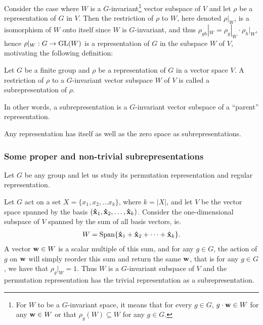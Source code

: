Consider the case where $W$ is a $G$-invariant\footnote{For $W$ to be a $G$-invariant space, it means that for every $g \in G$, $g \cdot \mathbf{w} \in W$ for any $\mathbf{w} \in W$ or that $\rho_g(W) \subseteq W$ for any $g\in G$.} vector subspace of $V$%
and let $\rho$ be a representation of $G$ in $V$. Then the restriction of $\rho$ to $W$, here denoted $\rho|_W$, is a isomorphism of $W$ onto itself since $W$ is $G$-invariant,
and thus $\rho_{gh}|_W = \rho_g|_W \cdot \rho_h|_W$, hence $\rho|_W: G \rightarrow \text{GL}(W)$ is a representation of $G$ in the subspace $W$ of $V$, motivating the following definition:

\begin{definition}[Subrepresentation]\label{def:subrepr}
	Let $G$ be a finite group and $\rho$ be a representation of $G$ in a vector space $V$. A restriction of $\rho$ to a $G$-invariant vector subspace $W$ of $V$ is called a subrepresentation of $\rho$.
\end{definition}

In other words, a subrepresentation is a $G$-invariant vector subspace of a ``parent'' representation. 

\begin{example}
	Any representation has itself as well as the zero space as subrepresentations.
\end{example}

\subsubsection{Some proper and non-trivial subrepresentations}

Let $G$ be any group and let us study its permutation representation and regular representation. 

\begin{example}\cite[Example 1.4.3.]{Sagan}\label{example:trivpermrepr}
	Let $G$ act on a set $X = \{x_1, x_2, \dots x_k\}$, where $k = |X|$, and let $V$ be the vector space spanned by the basis $(\mathbf{\hat{x}}_1, \mathbf{\hat{x}}_2, \dots, \mathbf{\hat{x}}_k)$. Consider the one-dimensional subspace of $V$ spanned by the sum of all basis vectors, ie. 
	\begin{align*}	
		W = \text{Span}\{ \mathbf{\hat{x}}_1 + \mathbf{\hat{x}}_2 + \dots + \mathbf{\hat{x}}_k \}.
	\end{align*}A vector $\mathbf{w} \in W$ is a scalar multiple of this sum, and for any $g \in G$, the action of $g$ on $\mathbf{w}$ will simply reorder this sum and return the same $\mathbf{w}$, that is for any $g \in G$, we have that $\rho_g|_W = 1$. Thus $W$ is a $G$-invariant subspace of $V$ and the permutation representation has the trivial representation as a subrepresentation.
\end{example}

